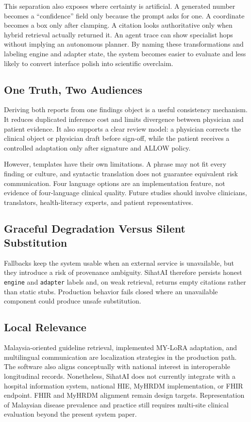 \documentclass[conference]{IEEEtran}
\begin{document}
This separation also exposes where certainty is artificial. A generated number becomes a ``confidence'' field only because the prompt asks for one. A coordinate becomes a box only after clamping. A citation looks authoritative only when hybrid retrieval actually returned it. An agent trace can show specialist hops without implying an autonomous planner. By naming these transformations and labeling engine and adapter state, the system becomes easier to evaluate and less likely to convert interface polish into scientific overclaim.

\subsection{One Truth, Two Audiences}

Deriving both reports from one findings object is a useful consistency mechanism. It reduces duplicated inference cost and limits divergence between physician and patient evidence. It also supports a clear review model: a physician corrects the clinical object or physician draft before sign-off, while the patient receives a controlled adaptation only after signature and ALLOW policy.

However, templates have their own limitations. A phrase may not fit every finding or culture, and syntactic translation does not guarantee equivalent risk communication. Four language options are an implementation feature, not evidence of four-language clinical quality. Future studies should involve clinicians, translators, health-literacy experts, and patient representatives.

\subsection{Graceful Degradation Versus Silent Substitution}

Fallbacks keep the system usable when an external service is unavailable, but they introduce a risk of provenance ambiguity. SihatAI therefore persists honest \texttt{engine} and \texttt{adapter} labels and, on weak retrieval, returns empty citations rather than static stubs. Production behavior fails closed where an unavailable component could produce unsafe substitution.

\subsection{Local Relevance}

Malaysia-oriented guideline retrieval, implemented MY-LoRA adaptation, and multilingual communication are localization strategies in the production path. The software also aligns conceptually with national interest in interoperable longitudinal records. Nonetheless, SihatAI does not currently integrate with a hospital information system, national HIE, MyHRDM implementation, or FHIR endpoint. FHIR \cite{hl7fhir} and MyHRDM alignment remain design targets. Representation of Malaysian disease prevalence and practice still requires multi-site clinical evaluation beyond the present system paper.
\end{document}
